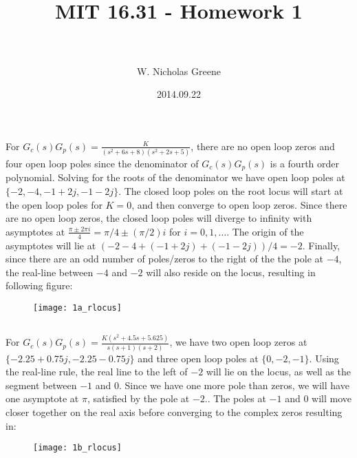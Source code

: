 \documentclass[paper=letter, fontsize=11pt]{scrartcl} %
\title{	
\normalfont \normalsize 
\horrule{0.5pt} \\[0.4cm] %
\huge MIT 16.31 - Homework 1 \\ %
\horrule{2pt} \\[0.5cm] %
}
\author{W. Nicholas Greene} %
\date{\normalsize2014.09.22} %
\numberwithin{equation}{section} %
\numberwithin{figure}{section} %
\numberwithin{table}{section} %
\begin{document}
\maketitle %

\section{}
\subsection{} 
For $G_c(s)G_p(s) = \frac{K}{(s^2 + 6s + 8)(s^2 + 2s + 5)}$, there are no open loop zeros
and four open loop poles since the denominator of $G_c(s)G_p(s)$ is a fourth order polynomial.
Solving for the roots of the denominator we have open loop poles at $\{-2, -4, -1 + 2j, -1 - 2j\}$.
The closed loop poles on the root locus will start at the open loop poles for $K = 0$, and
then converge to open loop zeros. Since there are no open loop zeros, the closed loop poles
will diverge to infinity with asymptotes at $\frac{\pi \pm 2\pi i}{4} = \pi/4 \pm (\pi/2) i$ 
for $i = 0, 1, \ldots$. The 
origin of the asymptotes will lie at $(-2 - 4 + (-1 + 2j) + (-1 - 2j))/4 = -2$. Finally,
since there are an odd number of poles/zeros to the right of the the pole at $-4$, 
the real-line between $-4$ and $-2$ will also reside on the locus, resulting in 
following figure:
\begin{figure}[h!]
  \centering
  \texttt{[image: 1a\_rlocus]}
\end{figure}

\subsection{}
For $G_c(s)G_p(s) = \frac{K(s^2 + 4.5s + 5.625)}{s(s+1)(s+2)}$, we have two open loop zeros 
at $\{-2.25 + 0.75j, -2.25 - 0.75j\}$ and three open loop poles at
$\{0, -2, -1\}$. Using the real-line rule, the real line to the left of $-2$ will lie on 
the locus, as well as the 
segment between $-1$ and $0$. Since we have one more pole than zeros, we will have one 
asymptote at $\pi$, satisfied by the pole at $-2$.. The poles at $-1$ and $0$ will move 
closer together on the real axis before converging to the complex zeros resulting in:
\begin{figure}[h!]
  \centering
  \texttt{[image: 1b\_rlocus]}
\end{figure}
\end{document}
